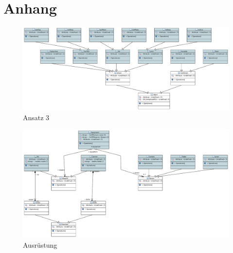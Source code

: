 \chapter{Anhang}
\begin{figure}
	\centering
	\includegraphics[height = 0.75 \textheight,width =\textwidth]{bilder/pdfvorlagen/ansatz3}
	\caption[Ansatz 3]{Ansatz 3}
	\label{ansatz3}
\end{figure}


\begin{figure}
	\centering
	\includegraphics[height = 0.75\textheight,width =\textwidth]{bilder/pdfvorlagen/equip}
	\caption[Ausrüstung]{Ausrüstung}
	\label{ausrüstung}
\end{figure}
